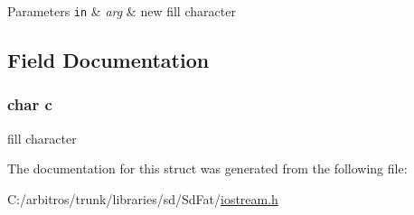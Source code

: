\begin{DoxyParams}[1]{Parameters}
\mbox{\tt in}  & {\em arg} & new fill character \\
\hline
\end{DoxyParams}


\subsection{Field Documentation}
\hypertarget{structsetfill_adc08ed1554f35803d229aeaf11216b3f}{
\subsubsection[{c}]{\setlength{\rightskip}{0pt plus 5cm}char c}}\label{structsetfill_adc08ed1554f35803d229aeaf11216b3f}
fill character 

The documentation for this struct was generated from the following file\-:\begin{DoxyCompactItemize}
\item 
C\-:/arbitros/trunk/libraries/sd/\-Sd\-Fat/\hyperlink{iostream_8h}{iostream.\-h}\end{DoxyCompactItemize}

